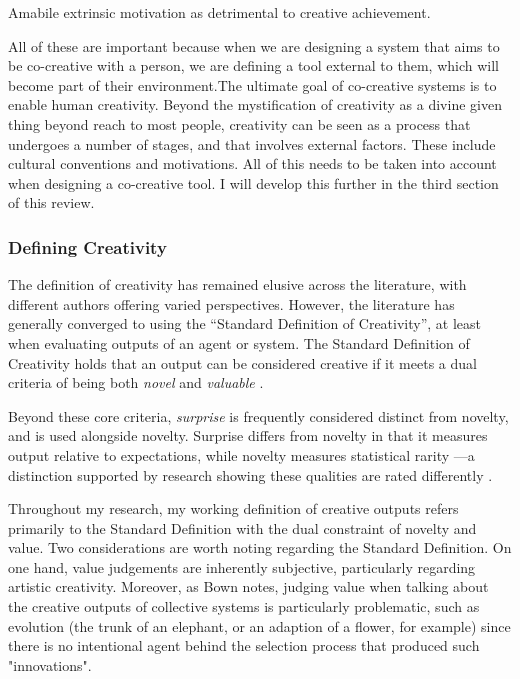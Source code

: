 Amabile extrinsic motivation as detrimental to creative achievement. 

All of these are important because when we are designing a system that aims to be co-creative with a person, we are defining a tool external to them, which will become part of their environment.The ultimate goal of co-creative systems is to enable human creativity. Beyond the mystification of creativity as a divine given thing beyond reach to most people, creativity can be seen as a process that undergoes a number of stages, and that involves external factors. These include cultural conventions and motivations. All of this needs to be taken into account when designing a co-creative tool. I will develop this further in the third section of this review. 

\subsubsection{Defining Creativity}

The definition of creativity has remained elusive across the literature, with different authors offering varied perspectives. However, the literature has generally converged to using the “Standard Definition of Creativity”, at least when evaluating outputs of an agent or system. The Standard Definition of Creativity holds that an output can be considered creative if it meets a dual criteria of being both \textit{novel} and \textit{valuable} \cite{Amabile1983-lj, Sternberg1998-oz, Runco2012-mk, Boden2003-hk}.

Beyond these core criteria, \textit{surprise} is frequently considered distinct from novelty, and is used alongside novelty. Surprise differs from novelty in that it measures output relative to expectations, while novelty measures statistical rarity \cite{Simonton2012-bv}—a distinction supported by research showing these qualities are rated differently \cite{Grace2015-uc}.

Throughout my research, my working definition of creative outputs refers primarily to the Standard Definition with the dual constraint of novelty and value. Two considerations are worth noting regarding the Standard Definition. On one hand, value judgements are inherently subjective, particularly regarding artistic creativity. Moreover, as Bown \cite{Bown2021-os, Bown2012-gg} notes, judging value when talking about the creative outputs of collective systems is particularly problematic, such as evolution (the trunk of an elephant, or an adaption of a flower, for example) since there is no intentional agent behind the selection process that produced such "innovations".

